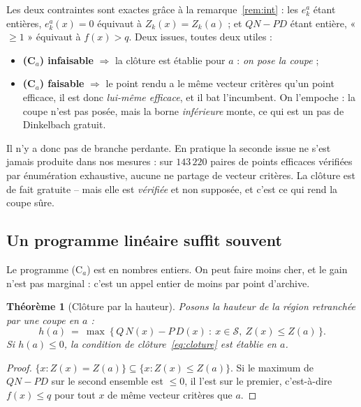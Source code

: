 \documentclass[11pt,a4paper]{article}
\theoremstyle{plain}
\newtheorem{theorem}{Théorème}
\theoremstyle{remark}
\newcommand{\Zk}{Z_k}
\newcommand{\Scal}{\mathcal{S}}
\begin{document}
\noindent
Les deux contraintes sont exactes grâce à la remarque~\ref{rem:int} : les
$e^a_k$ étant entières, $e^a_k(x)=0$ équivaut à $\Zk(x)=\Zk(a)$ ; et
$QN-PD$ étant entière, « $\ge 1$ » équivaut à $f(x)>q$. Deux issues, toutes
deux utiles :

\begin{itemize}[leftmargin=*,itemsep=3pt]
\item \textbf{(C$_a$) infaisable} $\Rightarrow$ la clôture est établie pour
      $a$ : \emph{on pose la coupe} ;
\item \textbf{(C$_a$) faisable} $\Rightarrow$ le point rendu a le même
      vecteur critères qu'un point efficace, il est donc \emph{lui-même
      efficace}, et il bat l'incumbent. On l'empoche : la coupe n'est pas
      posée, mais la borne \emph{inférieure} monte, ce qui est un pas de
      Dinkelbach gratuit.
\end{itemize}

\noindent
Il n'y a donc pas de branche perdante. En pratique la seconde issue ne s'est
jamais produite dans nos mesures : sur $143\,220$ paires de points efficaces
vérifiées par énumération exhaustive, aucune ne partage de vecteur critères.
La clôture est de fait gratuite -- mais elle est \emph{vérifiée} et non
supposée, et c'est ce qui rend la coupe sûre.

\subsection{Un programme linéaire suffit souvent}
\label{sec:lemme}

Le programme (C$_a$) est en nombres entiers. On peut faire moins cher, et
le gain n'est pas marginal : c'est un appel entier de moins par point
d'archive.

\begin{theorem}[Clôture par la hauteur]\label{th:hauteur}
Posons la \emph{hauteur de la région} retranchée par une coupe en $a$ :
\[
  h(a)\ =\ \max\ \bigl\{\,Q\,N(x)-P\,D(x)\ :\ x\in\Scal,\ Z(x)\le Z(a)\,\bigr\}.
\]
Si $h(a)\le 0$, la condition de clôture~\eqref{eq:cloture} est établie
en $a$.
\end{theorem}

\begin{proof}
$\{x : Z(x)=Z(a)\}\subseteq\{x : Z(x)\le Z(a)\}$. Si le maximum de
$QN-PD$ sur le second ensemble est $\le 0$, il l'est sur le premier,
c'est-à-dire $f(x)\le q$ pour tout $x$ de même vecteur critères que $a$.
\end{proof}
\end{document}

